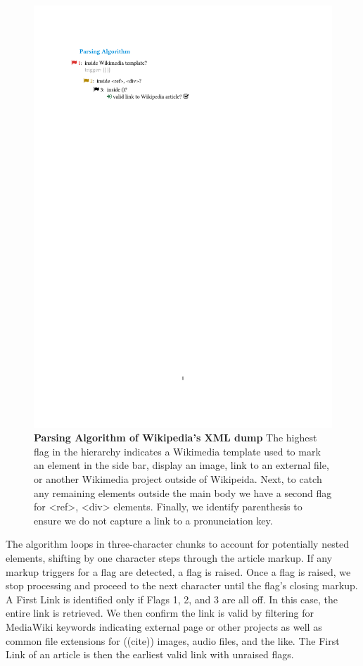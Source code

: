 \documentclass[pre,twocolumn,twoside,superscriptaddress,floatfix, aps, 10pt]{revtex4-1}
\begin{document}
\begin{figure}[tp!]
  \centering	
  \includegraphics[width=\columnwidth]{graphics/flags.pdf}  
  \caption{
    \textbf{Parsing Algorithm of Wikipedia's XML dump}
     The highest flag in the hierarchy indicates a Wikimedia template used to mark an element in the side bar, display an image, link to an external file, or another Wikimedia project outside of Wikipeida. Next, to catch any remaining elements outside the main body we have a second flag for <ref>, <div> elements. Finally, we identify parenthesis to ensure we do not capture a link to a pronunciation key.
  }
  \label{fig:parsing algorithm}
\end{figure}

The algorithm loops in three-character chunks to account for potentially nested elements, 
shifting by one character steps through the article markup.
If any markup triggers for a flag are detected, a flag is raised. 
Once a flag is raised, we stop processing and proceed to the next character
until the flag's closing markup.
A First Link is identified only if Flags 1, 2, and 3 are all off.
In this case, the entire link is retrieved. 
We then confirm the link is valid by filtering for MediaWiki keywords indicating external page or other projects
as well as common file extensions for 
((cite))
images, audio files, and the like.
The First Link of an article is then the earliest valid link with unraised flags.
\end{document}
